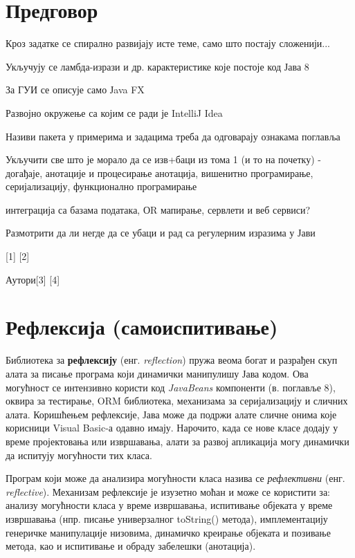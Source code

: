 




\chapter*{Предговор}
\thispagestyle{plain}


Кроз задатке се спирално развијају исте теме, само што постају сложенији...


Укључују се ламбда-изрази и др. карактеристике које постоје код Јава 8

За ГУИ се описује само Јava FX

Развојно окружење са којим се ради је IntelliJ Idea


Називи пакета у примерима и задацима треба да одговарају ознакама поглавља


Укључити све што је морало да се изв+баци из тома 1 (и то на почетку)  -  догађаје, анотације и процесирање анотација, вишенитно програмирање, серијализацију, функционално програмирање

интеграција са базама података, ОR мапирање, сервлети и веб сервиси?


Размотрити да ли негде да се убаци и рад са регулерним изразима у Јави

[1] [2] 


                          Аутори[3] [4] 




\setlength{\parindent}{15pt}
\setlength{\parskip}{0pt}
\chapter{Рефлексија (самоиспитивање)}

Библиотека за \textbf{рефлексију} (енг. \textit{reflection}) пружа веома богат и разрађен скуп алата за писање програма који динамички манипулишу Јава кодом. Ова могућност се интензивно користи код \textit{JavaBeans} компоненти (в. поглавље 8), оквира за тестирање, ORM библиотека, механизама за серијализацију и сличних алата. Коришћењем рефлексије, Јава може да подржи алате сличне онима које корисници Visual Basic-а одавно имају. Нарочито, када се нове класе додају у време пројектовања или извршавања, алати за развој апликација могу динамички да испитују могућности тих класа.

Програм који може да анализира могућности класа назива се \textit{рефлективни} (енг. \textit{reflective}). Механизам рефлексије је изузетно моћан и може се користити за: анализу могућности класа у време извршавања, испитивање објеката у време извршавања (нпр. писање универзалног toString() метода), имплементацију генеричке манипулације низовима, динамичко креирање објеката и позивање метода, као и испитивање и обраду забелешки (анотација).

